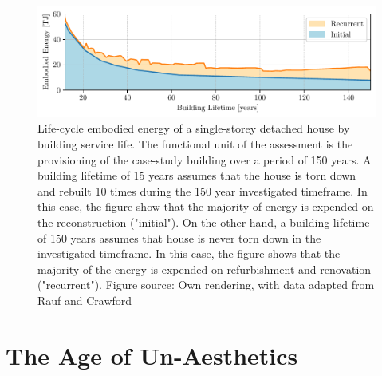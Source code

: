 \documentclass{article}
\begin{document}
\begin{figure}[ht!]
    \includegraphics[width=\textwidth]{./figures/building_embodied_energy.pdf}
    \vspace{-5mm}
    \caption{
        Life-cycle embodied energy of a single-storey detached house by building service life. The functional unit of the assessment is the provisioning of the case-study building over a period of 150 years. A building lifetime of 15 years assumes that the house is torn down and rebuilt 10 times during the 150 year investigated timeframe. In this case, the figure show that the majority of energy is expended on the reconstruction ("initial"). On the other hand, a building lifetime of 150 years assumes that house is never torn down in the investigated timeframe. In this case, the figure shows that the majority of the energy is expended on refurbishment and renovation ("recurrent").
        \newline Figure source: Own rendering, with data adapted from Rauf and Crawford \cite[Figure 5]{rauf_building_2015}
    }
    \label{fig:energy}
\end{figure}

\clearpage
\section{The Age of Un-Aesthetics}
\label{sec:aesthetics}
\end{document}
